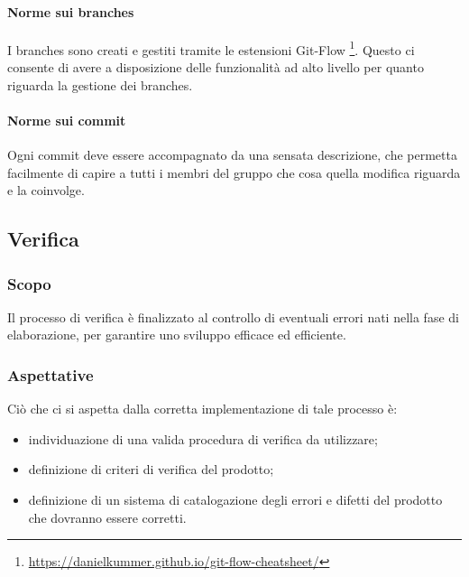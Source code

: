 \documentclass[11pt,a4paper]{article}
\begin{document}
{\paragraph{Norme sui branches}
I branches sono creati e gestiti tramite le estensioni Git-Flow
\footnote{\url{https://danielkummer.github.io/git-flow-cheatsheet/}}. 
Questo ci consente di avere a disposizione delle funzionalità ad alto livello per quanto riguarda la gestione dei branches. 

\paragraph{Norme sui commit}
Ogni commit deve essere accompagnato da una sensata descrizione, che permetta facilmente di capire a tutti i membri del gruppo che cosa quella modifica riguarda e la coinvolge.



	\subsection{Verifica}
	
	\subsubsection{Scopo}
	Il processo di verifica è finalizzato al controllo di eventuali errori nati nella fase di elaborazione, per garantire uno sviluppo efficace ed efficiente.
	
	\subsubsection{Aspettative}
	Ciò che ci si aspetta dalla corretta implementazione di tale processo è:
	\begin{itemize}
		\item individuazione di una valida procedura di verifica da utilizzare;
		\item definizione di criteri di verifica del prodotto;
		\item definizione di un sistema di catalogazione degli errori e difetti del prodotto che dovranno essere corretti.
	\end{itemize}	
	
	
}
\end{document}
